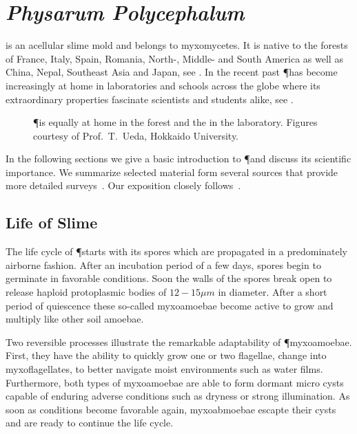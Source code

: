 \section{\textit{Physarum Polycephalum}}

	\Pp is an acellular slime mold and belongs to myxomycetes. It is native to the forests of France, Italy, Spain, Romania, North-, Middle- and South America as well as China, Nepal, Southeast Asia and Japan, see . In the recent past \P has become increasingly at home in laboratories and schools across the globe where its extraordinary properties fascinate scientists and students alike, see .

	\begin{figure}
		\centering
		\caption[\P exploring various environments]{\P is equally at home in the forest and the in the laboratory. Figures courtesy of Prof.~T.~Ueda, Hokkaido University.}
		\label{fig:exploration}
	\end{figure}

	In the following sections we give a basic introduction to \P and discuss its scientific importance. We summarize selected material form several sources that provide more detailed surveys~\cite{stephenson1994myxomycetes,nowotny2000myxomyceten,grube2016physarum,Sauer1986,Mayne2016,howard1931life}. Our exposition closely follows~\cite{nowotny2000myxomyceten}.

	\subsection{Life of Slime}

		The life cycle of \P starts with its spores which are propagated in a predominately airborne fashion. After an incubation period of a few days, spores begin to germinate in favorable conditions. Soon the walls of the spores break open to release haploid protoplasmic bodies of $12-15 \mu m$ in diameter. After a short period of quiescence these so-called myxoamoebae become active to grow and multiply like other soil amoebae. 

		Two reversible processes illustrate the remarkable adaptability of \P myxoamoebae. First, they have the ability to quickly grow one or two flagellae, \ie change into myxoflagellates, to better navigate moist environments such as water films. Furthermore, both types of myxoamoebae are able to form dormant micro cysts capable of enduring adverse conditions such as dryness or strong illumination. As soon as conditions become favorable again, myxoabmoebae escapte their cysts and are ready to continue the life cycle.

